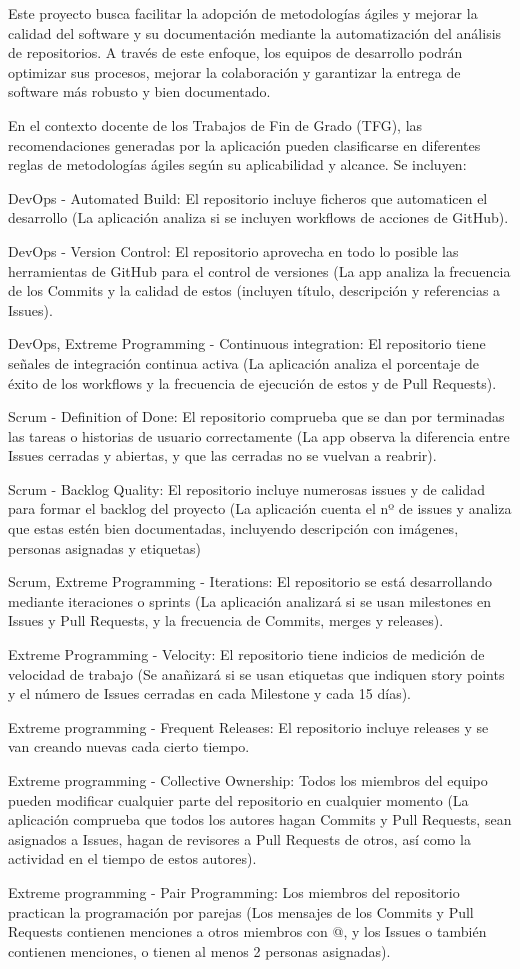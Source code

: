 Este proyecto busca facilitar la adopción de metodologías ágiles y mejorar la calidad del software y su documentación mediante la automatización del análisis de repositorios. A través de este enfoque, los equipos de desarrollo podrán optimizar sus procesos, mejorar la colaboración y garantizar la entrega de software más robusto y bien documentado.

En el contexto docente de los Trabajos de Fin de Grado (TFG), las recomendaciones generadas por la aplicación pueden clasificarse en diferentes reglas de metodologías ágiles según su aplicabilidad y alcance. Se incluyen:

DevOps - Automated Build: El repositorio incluye ficheros que automaticen el desarrollo (La aplicación analiza si se incluyen workflows de acciones de GitHub).

DevOps - Version Control: El repositorio aprovecha en todo lo posible las herramientas de GitHub para el control de versiones (La app analiza la frecuencia de los Commits y la calidad de estos (incluyen título, descripción y referencias a Issues).

DevOps, Extreme Programming - Continuous integration: El repositorio tiene señales de integración continua activa (La aplicación analiza el porcentaje de éxito de los workflows y la frecuencia de ejecución de estos y de Pull Requests).

Scrum - Definition of Done: El repositorio comprueba que se dan por terminadas las tareas o historias de usuario correctamente (La app observa la diferencia entre Issues cerradas y abiertas, y que las cerradas no se vuelvan a reabrir).

Scrum - Backlog Quality: El repositorio incluye numerosas issues y de calidad para formar el backlog del proyecto (La aplicación cuenta el nº de issues y analiza que estas estén bien documentadas, incluyendo descripción con imágenes, personas asignadas y etiquetas)

Scrum, Extreme Programming - Iterations: El repositorio se está desarrollando mediante iteraciones o sprints (La aplicación analizará si se usan milestones en Issues y Pull Requests, y la frecuencia de Commits, merges y releases).

Extreme Programming - Velocity: El repositorio tiene indicios de medición de velocidad de trabajo (Se anañizará si se usan etiquetas que indiquen story points y el número de Issues cerradas en cada Milestone y cada 15 días).

Extreme programming - Frequent Releases: El repositorio incluye releases y se van creando nuevas cada cierto tiempo.

Extreme programming - Collective Ownership: Todos los miembros del equipo pueden modificar cualquier parte del repositorio en cualquier momento (La aplicación comprueba que todos los autores hagan Commits y Pull Requests, sean asignados a Issues, hagan de revisores a Pull Requests de otros, así como la actividad en el tiempo de estos autores).

Extreme programming - Pair Programming: Los miembros del repositorio practican la programación por parejas (Los mensajes de los Commits y Pull Requests contienen menciones a otros miembros con @, y los Issues o también contienen menciones, o tienen al menos 2 personas asignadas).